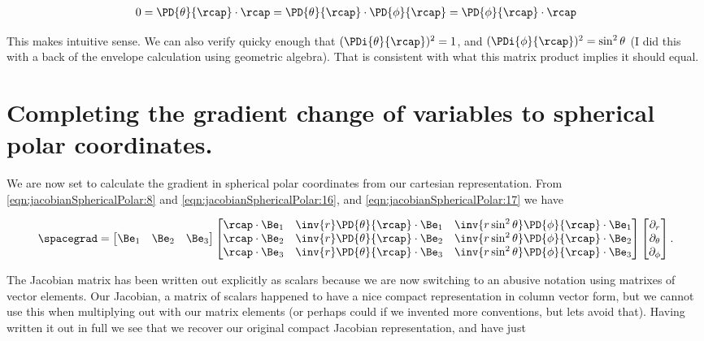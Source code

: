 \begin{align}\label{eqn:jacobianSphericalPolar:19}
0 = \PD{\theta}{\rcap} \cdot \rcap = \PD{\theta}{\rcap} \cdot \PD{\phi}{\rcap} = \PD{\phi}{\rcap} \cdot \rcap 
\end{align}

This makes intuitive sense.  We can also verify quicky enough that $(\PDi{\theta}{\rcap})^2 = 1$, and $(\PDi{\phi}{\rcap})^2 = \sin^2\theta$ (I did this with a back of the envelope calculation using geometric algebra).  That is consistent with what this matrix product implies it should equal.

\section{Completing the gradient change of variables to spherical polar coordinates.}

We are now set to calculate the gradient in spherical polar coordinates from our cartesian representation.  From \ref{eqn:jacobianSphericalPolar:8} and
\ref{eqn:jacobianSphericalPolar:16}, and \ref{eqn:jacobianSphericalPolar:17} we have

\begin{align}\label{eqn:jacobianSphericalPolar:20}
\spacegrad =
\begin{bmatrix}
\Be_1 & \Be_2 & \Be_3  
\end{bmatrix}
\begin{bmatrix}
\rcap \cdot \Be_1 & \inv{r} \PD{\theta}{\rcap} \cdot \Be_1 & \inv{r \sin^2\theta} \PD{\phi}{\rcap} \cdot \Be_1 \\
\rcap \cdot \Be_2 & \inv{r} \PD{\theta}{\rcap} \cdot \Be_2 & \inv{r \sin^2\theta} \PD{\phi}{\rcap} \cdot \Be_2 \\
\rcap \cdot \Be_3 & \inv{r} \PD{\theta}{\rcap} \cdot \Be_3 & \inv{r \sin^2\theta} \PD{\phi}{\rcap} \cdot \Be_3 
\end{bmatrix}
\begin{bmatrix}
\partial_r \\
\partial_\theta \\
\partial_\phi
\end{bmatrix}.
\end{align}

The Jacobian matrix has been written out explicitly as scalars because we are now switching to an abusive notation using matrixes of vector elements.  Our Jacobian, a matrix of scalars happened to have a nice compact representation in column vector form, but we cannot use this when multiplying out with our matrix elements (or perhaps could if we invented more conventions, but lets avoid that).  Having written it out in full we see that we recover our original compact Jacobian representation, and have just

